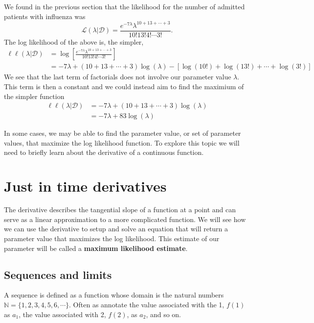 \ex We found in the previous section that the likelihood for the number of admitted patients with influenza was
\begin{equation}
\mathcal{L}(\lambda | \mathcal{D}) = \frac{e^{-7\lambda} \lambda^{10+13+\cdots+3}}{10! 13! 4! \cdots 3!}.
\end{equation}
The log likelihood of the above is, the simpler, 
\begin{align}
    \ell \ell (\lambda | \mathcal{D}) &= \log \left[ \frac{e^{-7\lambda} \lambda^{10+13+\cdots+3}}{10! 13! 4! \cdots 3!} \right] \\ 
    &= -7 \lambda + (10+13+\cdots+3) \log(\lambda) - \left[ \log(10!) + \log(13!) + \cdots + \log(3!) \right]
\end{align}
We see that the last term of factorials does not involve our parameter value $\lambda$. 
This term is then a constant and we could instead aim to find the maximium of the simpler function 
\begin{align}
    \ell \ell (\lambda | \mathcal{D}) &= -7 \lambda + (10+13+\cdots+3) \log(\lambda) \\ 
    &=  -7 \lambda + 83\log(\lambda)
\end{align}

In some cases, we may be able to find the parameter value, or set of parameter values, that maximize the log likelihood function. 
To explore this topic we will need to briefly learn about the derivative of a continuous function. 

\section{ Just in time derivatives }

The derivative describes the tangential slope of a function at a point and can serve as a linear approximation to a more complicated function.
We will see how we can use the derivative to setup and solve an equation that will return a parameter value that maximizes the log likelihood. 
This estimate of our parameter will be called a \textbf{maximum likelihood estimate}.

\subsection{Sequences and limits}

A sequence is defined as a function whose domain is the natural numbers $\mathbb{N} = \{1,2,3,4,5,6, \cdots  \}$. 
Often as annotate the value associated with the 1, $f(1)$ as $a_{1}$, the value associated with 2, $f(2)$, as $a_{2}$, and so on.

